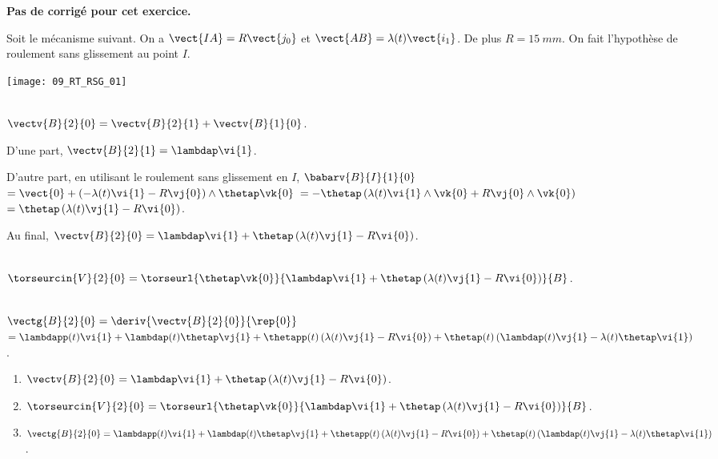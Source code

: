 \normalfalse \difficiletrue \tdifficilefalse
\correctiontrue


\setcounter{numques}{0}
\ifcorrection
\else
\textbf{Pas de corrigé pour cet exercice.}
\fi

\ifprof
\else
Soit le mécanisme suivant. On a $\vect{IA}=R\vect{j_0}$ et $\vect{AB}=\lambda(t)\vect{i_1}$. De plus $R=\SI{15}{mm}$.
On fait l'hypothèse de roulement sans glissement au point $I$.
\begin{center}
\texttt{[image: 09\_RT\_RSG\_01]}
\end{center}
\fi


\ifprof ~\\
$\vectv{B}{2}{0}=\vectv{B}{2}{1}+\vectv{B}{1}{0}$.

D'une part,  $\vectv{B}{2}{1}=\lambdap\vi{1}$.

D'autre part, en utilisant le roulement sans glissement en $I$, 
$\babarv{B}{I}{1}{0} $ $=\vect{0}+\left(-\lambda(t)\vi{1}-R\vj{0} \right)\wedge\thetap \vk{0}$
$=-\thetap\left(\lambda(t)\vi{1}\wedge \vk{0}+R\vj{0}\wedge \vk{0} \right)$
$=\thetap\left(\lambda(t)\vj{1}-R\vi{0} \right)$.

Au final, $\vectv{B}{2}{0} = \lambdap\vi{1} + \thetap\left(\lambda(t)\vj{1}-R\vi{0} \right)$.

\else
\fi

\ifprof ~\\
$\torseurcin{V}{2}{0}=\torseurl{\thetap \vk{0}}{ \lambdap\vi{1} + \thetap\left(\lambda(t)\vj{1}-R\vi{0} \right)}{B}$.
\else
\fi

\ifprof ~\\
$\vectg{B}{2}{0} = \deriv{\vectv{B}{2}{0}}{\rep{0}}$
$ = \lambdapp(t)\vi{1} +\lambdap(t)\thetap\vj{1} 
+ \thetapp(t)\left(\lambda(t)\vj{1}-R\vi{0} \right)
+ \thetap(t)\left(\lambdap(t)\vj{1}-\lambda(t)\thetap\vi{1} \right)
$.
\else
\fi

\ifprof
\else
\ifcolle
\else
\begin{solution}
\begin{enumerate}
\item $\vectv{B}{2}{0} = \lambdap\vi{1} + \thetap\left(\lambda(t)\vj{1}-R\vi{0} \right)$.
\item $\torseurcin{V}{2}{0}=\torseurl{\thetap \vk{0}}{ \lambdap\vi{1} + \thetap\left(\lambda(t)\vj{1}-R\vi{0} \right)}{B}$.
\item $\vectg{B}{2}{0}  = \lambdapp(t)\vi{1} +\lambdap(t)\thetap\vj{1} 
+ \thetapp(t)\left(\lambda(t)\vj{1}-R\vi{0} \right)
+ \thetap(t)\left(\lambdap(t)\vj{1}-\lambda(t)\thetap\vi{1} \right)
$.
\end{enumerate} 
\end{solution}
\fi

\fi